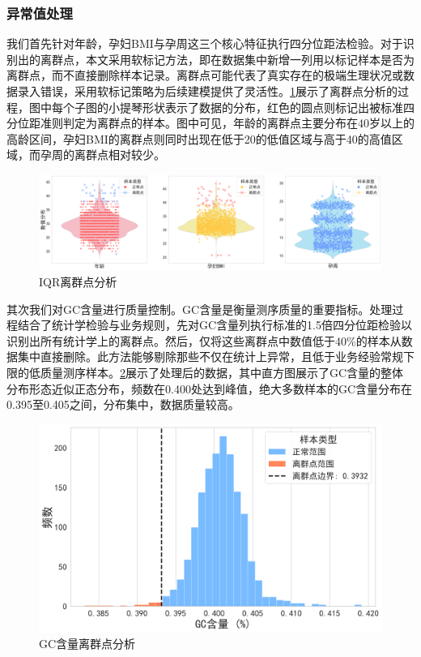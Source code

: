 \subsubsection{异常值处理}

我们首先针对年龄，孕妇BMI与孕周这三个核心特征执行四分位距法检验。对于识别出的离群点，本文采用软标记方法，即在数据集中新增一列用以标记样本是否为离群点，而不直接删除样本记录。离群点可能代表了真实存在的极端生理状况或数据录入错误，采用软标记策略为后续建模提供了灵活性。\cref{fig:IQR离群点分析}展示了离群点分析的过程，图中每个子图的小提琴形状表示了数据的分布，红色的圆点则标记出被标准四分位距准则判定为离群点的样本。图中可见，年龄的离群点主要分布在40岁以上的高龄区间，孕妇BMI的离群点则同时出现在低于20的低值区域与高于40的高值区域，而孕周的离群点相对较少。

\begin{figure}[h!]
\centering
\includegraphics[width=1\textwidth]{figs/2模型准备/图3_IQR离群点分析.png}
\caption{IQR离群点分析}
\label{fig:IQR离群点分析}
\end{figure}

其次我们对GC含量进行质量控制。GC含量是衡量测序质量的重要指标。处理过程结合了统计学检验与业务规则，先对GC含量列执行标准的1.5倍四分位距检验以识别出所有统计学上的离群点。然后，仅将这些离群点中数值低于40\%的样本从数据集中直接删除。此方法能够剔除那些不仅在统计上异常，且低于业务经验常规下限的低质量测序样本。\cref{fig:GC含量离群点分析}展示了处理后的数据，其中直方图展示了GC含量的整体分布形态近似正态分布，频数在0.400处达到峰值，绝大多数样本的GC含量分布在0.395至0.405之间，分布集中，数据质量较高。

\begin{figure}[h!]
\centering
\includegraphics[width=\textwidth]{figs/2模型准备/图4_GC含量离群点分析.png}
\caption{GC含量离群点分析}
\label{fig:GC含量离群点分析}
\end{figure}


